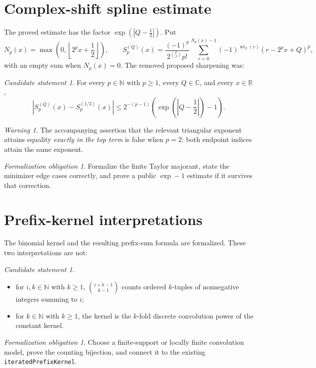\documentclass[11pt,oneside]{article}
\theoremstyle{definition}
\theoremstyle{remark}
\newtheorem{warning}[theorem]{Warning}
\newcommand{\R}{\mathbb R}
\newcommand{\C}{\mathbb C}
\newcommand{\N}{\mathbb N}
\newcommand{\wt}{\operatorname{wt}_2}
\newtheorem{candidate}[theorem]{Candidate statement}
\newtheorem{obligation}[theorem]{Formalization obligation}
\begin{document}
\section{Complex-shift spline estimate}

The proved estimate has the factor
\(\exp(|Q-\tfrac12|)\).  Put
\[
 N_p(x)=\max\!\left(0,\left\lfloor2^px+\frac12\right\rfloor\right),\qquad
 S_p^{(Q)}(x)=\frac{(-1)^p}{2^{\binom p2}p!}
 \sum_{r=0}^{N_p(x)-1}(-1)^{\wt(r)}(r-2^px+Q)^p,
\]
with an empty sum when \(N_p(x)=0\).  The removed proposed sharpening was:
\begin{candidate}
For every \(p\in\N\) with \(p\ge1\), every \(Q\in\C\), and every \(x\in\R\),
\[
 \left|S_p^{(Q)}(x)-S_p^{(1/2)}(x)\right|
 \le2^{-(p-1)}
 \left(\exp\!\left(\left|Q-\frac12\right|\right)-1\right).
\]
\end{candidate}
\begin{warning}
The accompanying assertion that the relevant triangular exponent attains equality
\emph{exactly in the top term} is false when \(p=2\): both endpoint indices attain the same
exponent.
\end{warning}
\begin{obligation}
Formalize the finite Taylor majorant, state the minimizer edge cases correctly, and prove a
public \(\exp-1\) estimate if it survives that correction.
\end{obligation}

\section{Prefix-kernel interpretations}

The binomial kernel and the resulting prefix-sum formula are formalized.  These two
interpretations are not:
\begin{candidate}
\begin{itemize}
\item for \(i,k\in\N\) with \(k\ge1\), \(\binom{i+k-1}{k-1}\) counts ordered \(k\)-tuples
      of nonnegative integers summing to \(i\);
\item for \(k\in\N\) with \(k\ge1\), the kernel is the \(k\)-fold discrete convolution
      power of the constant kernel.
\end{itemize}
\end{candidate}
\begin{obligation}
Choose a finite-support or locally finite convolution model, prove the counting bijection,
and connect it to the existing \texttt{iteratedPrefixKernel}.
\end{obligation}
\end{document}
